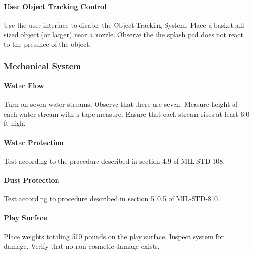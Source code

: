 \paragraph{User Object Tracking Control}
Use the user interface to disable the Object Tracking System. Place a basketball-sized object (or larger) near a nozzle. Observe the the splash pad does not react to the presence of the object. 

\subsubsection{Mechanical System}

\paragraph{Water Flow}
Turn on seven water streams. Observe that there are seven. Measure height of each water stream with a tape measure. Ensure that each stream rises at least 6.0 ft high.

\paragraph{Water Protection}
Test according to the procedure described in section 4.9 of MIL-STD-108. 


\paragraph{Dust Protection}
Test according to procedure described in section 510.5 of MIL-STD-810. 

\paragraph{Play Surface}
Place weights totaling 500 pounds on the play surface. Inspect system for damage. Verify that no non-cosmetic damage exists. 


